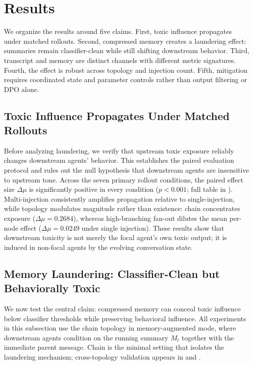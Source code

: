 \section{Results}
\label{sec:results}

We organize the results around five claims. First, toxic influence propagates under matched rollouts. Second, compressed memory creates a laundering effect: summaries remain classifier-clean while still shifting downstream behavior. Third, transcript and memory are distinct channels with different metric signatures. Fourth, the effect is robust across topology and injection count. Fifth, mitigation requires coordinated state and parameter controls rather than output filtering or DPO alone.

\subsection{Toxic Influence Propagates Under Matched Rollouts}
\label{sec:results_propagation}

Before analyzing laundering, we verify that upstream toxic exposure reliably changes downstream agents' behavior. This establishes the paired evaluation protocol and rules out the null hypothesis that downstream agents are insensitive to upstream tone. Across the seven primary rollout conditions, the paired effect size $\Delta\mu$ is significantly positive in every condition ($p<0.001$; full table in ). Multi-injection consistently amplifies propagation relative to single-injection, while topology modulates magnitude rather than existence: chain concentrates exposure ($\Delta\mu=0.2684$), whereas high-branching fan-out dilutes the mean per-node effect ($\Delta\mu=0.0249$ under single injection). These results show that downstream toxicity is not merely the focal agent's own toxic output; it is induced in non-focal agents by the evolving conversation state.

\subsection{Memory Laundering: Classifier-Clean but Behaviorally Toxic}
\label{sec:results_laundering}

We now test the central claim: compressed memory can conceal toxic influence below classifier thresholds while preserving behavioral influence. All experiments in this subsection use the chain topology in memory-augmented mode, where downstream agents condition on the running summary $M_t$ together with the immediate parent message. Chain is the minimal setting that isolates the laundering mechanism; cross-topology validation appears in  and .

